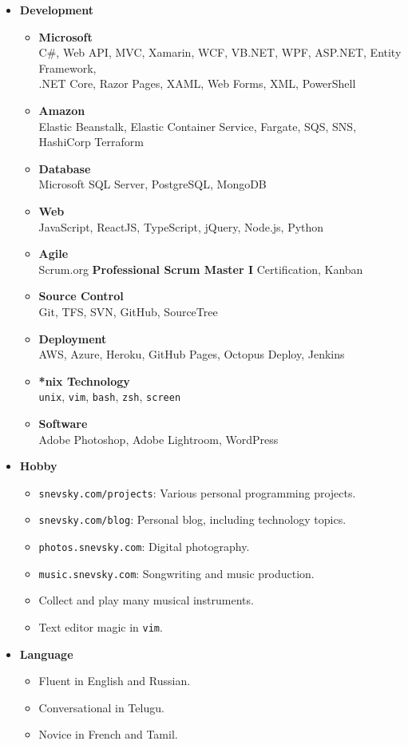 \documentclass[letterpaper,11pt]{article}
\newcommand{\resitem}[1]{\item #1 \vspace{0pt}}
\begin{document}
\begin{itemize}

    \item {\bf Development}

        \begin{itemize}
            \resitem{\textbf{Microsoft} \\ C\#, Web API, MVC, Xamarin, WCF, VB.NET, WPF, ASP.NET, 
            Entity Framework, \\ .NET Core, Razor Pages, XAML, Web Forms, XML, PowerShell}
            \resitem{\textbf{Amazon} \\ Elastic Beanstalk, Elastic Container Service, Fargate, SQS, SNS, HashiCorp Terraform}
            \resitem{\textbf{Database} \\ Microsoft SQL Server, PostgreSQL, MongoDB}
            \resitem{\textbf{Web} \\ JavaScript, ReactJS, TypeScript, jQuery, Node.js, Python}
            \resitem{\textbf{Agile} \\ Scrum.org \textbf{Professional Scrum Master I} Certification, Kanban}
            \resitem{\textbf{Source Control} \\ Git, TFS, SVN, GitHub, SourceTree}
            \resitem{\textbf{Deployment} \\ AWS, Azure, Heroku, GitHub Pages, Octopus Deploy, Jenkins}
            \resitem{\textbf{*nix Technology} \\ \texttt{unix}, \texttt{vim}, \texttt{bash}, \texttt{zsh}, \texttt{screen}}
            \resitem{\textbf{Software} \\ Adobe Photoshop, Adobe Lightroom, WordPress}
        \end{itemize}

    \item {\bf Hobby}

      \begin{itemize}
          \resitem{\texttt{snevsky.com/projects}: Various personal programming projects.}
          \resitem{\texttt{snevsky.com/blog}: Personal blog, including technology topics.}
          \resitem{\texttt{photos.snevsky.com}: Digital photography.}
          \resitem{\texttt{music.snevsky.com}: Songwriting and music production.}
          \resitem{Collect and play many musical instruments.}
          \resitem{Text editor magic in \texttt{vim}.}
      \end{itemize}

    \item {\bf Language}

    \begin{itemize}
        \resitem{Fluent in English and Russian.}
        \resitem{Conversational in Telugu.}
        \resitem{Novice in French and Tamil.}
    \end{itemize}



\end{itemize}
\end{document}
